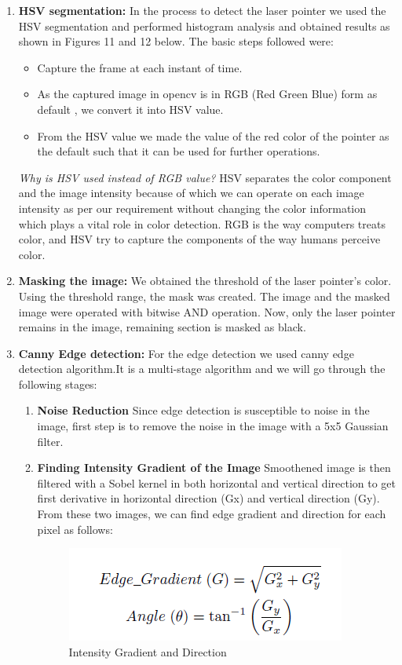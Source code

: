 \documentclass[12pt, a4paper]{article}
\begin{document}
\begin{enumerate}
	\item \textbf{HSV segmentation:}
	In the process to detect the laser pointer we used the HSV segmentation and performed histogram analysis and obtained results as shown in Figures 11 and 12 below.
	The basic steps followed were:
	\begin{itemize}
	\item Capture the frame at each instant of time.
	\item As the captured image in opencv is in RGB (Red Green Blue) form as default , we convert it into HSV value.
	\item From the HSV value we made the value of the red color of the pointer as the default such that it can be used for further operations.
	\end{itemize}
	\emph {Why is HSV used instead of RGB value?}
	HSV separates the color component and the image intensity because of which we can operate on each image intensity as per our requirement without changing the color information which plays a vital role in color detection. RGB is the way computers treats color, and HSV try to capture the components of the way humans perceive color.   
	\item \textbf{Masking the image:}
		We obtained the threshold of the laser pointer’s color. Using the threshold range, the mask was created. The image and the masked image were operated with bitwise AND operation. Now, only the laser pointer remains in the image, remaining section is masked as black.

	\item \textbf{Canny Edge detection:}
For the edge detection we used canny edge detection algorithm.It is a multi-stage algorithm and we will go through the following stages:
\begin{enumerate}
\item \textbf {Noise Reduction}
Since edge detection is susceptible to noise in the image, first step is to remove the noise in the image with a 5x5 Gaussian filter.
\item \textbf{Finding Intensity Gradient of the Image}
Smoothened image is then filtered with a Sobel kernel in both horizontal and vertical direction to get first derivative in horizontal direction (Gx) and vertical direction (Gy). From these two images, we can find edge gradient and direction for each pixel as follows:
\begin{figure}[htp]
\centering
\includegraphics[scale=0.7]{canny.png}
\caption{Intensity Gradient and Direction}
\label{}
\end{figure}


\end{enumerate}
\end{enumerate}
\end{document}
